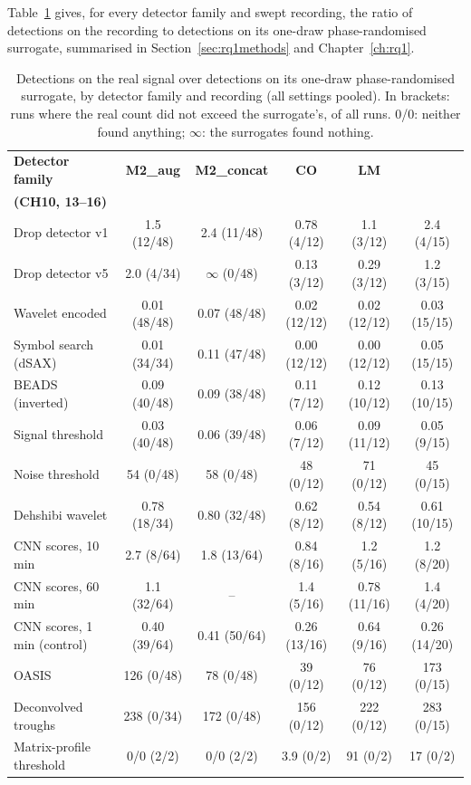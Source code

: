 Table~\ref{tab:detnull} gives, for every detector family and swept recording, the ratio of detections on the recording to detections on its one-draw phase-randomised surrogate, summarised in Section~\ref{sec:rq1methods} and Chapter~\ref{ch:rq1}.

\begin{table}[htbp]
\caption[{Real against surrogate detections, by detector family and recording.}]{Detections on the real signal over detections on its one-draw phase-randomised surrogate, by detector family and recording (all settings pooled). In brackets: runs where the real count did not exceed the surrogate's, of all runs. 0/0: neither found anything; $\infty$: the surrogates found nothing.}
\label{tab:detnull}
\footnotesize
\centering
\setlength{\tabcolsep}{3pt}
\begin{tabular}{lccccc}
\toprule
\textbf{Detector family} & \textbf{M2\_aug} & \textbf{M2\_concat} & \textbf{CO} & \textbf{LM} &
\makecell{\textbf{MJu26a}\\\textbf{(CH10, 13--16)}}\\
\midrule
Drop detector v1 & 1.5 (12/48) & 2.4 (11/48) & 0.78 (4/12) & 1.1 (3/12) & 2.4 (4/15)\\
Drop detector v5 & 2.0 (4/34) & $\infty$ (0/48) & 0.13 (3/12) & 0.29 (3/12) & 1.2 (3/15)\\
Wavelet encoded & 0.01 (48/48) & 0.07 (48/48) & 0.02 (12/12) & 0.02 (12/12) & 0.03 (15/15)\\
Symbol search (dSAX) & 0.01 (34/34) & 0.11 (47/48) & 0.00 (12/12) & 0.00 (12/12) & 0.05 (15/15)\\
BEADS (inverted) & 0.09 (40/48) & 0.09 (38/48) & 0.11 (7/12) & 0.12 (10/12) & 0.13 (10/15)\\
Signal threshold & 0.03 (40/48) & 0.06 (39/48) & 0.06 (7/12) & 0.09 (11/12) & 0.05 (9/15)\\
Noise threshold & 54 (0/48) & 58 (0/48) & 48 (0/12) & 71 (0/12) & 45 (0/15)\\
Dehshibi wavelet & 0.78 (18/34) & 0.80 (32/48) & 0.62 (8/12) & 0.54 (8/12) & 0.61 (10/15)\\
CNN scores, 10\,min & 2.7 (8/64) & 1.8 (13/64) & 0.84 (8/16) & 1.2 (5/16) & 1.2 (8/20)\\
CNN scores, 60\,min & 1.1 (32/64) & -- & 1.4 (5/16) & 0.78 (11/16) & 1.4 (4/20)\\
CNN scores, 1\,min (control) & 0.40 (39/64) & 0.41 (50/64) & 0.26 (13/16) & 0.64 (9/16) & 0.26 (14/20)\\
OASIS & 126 (0/48) & 78 (0/48) & 39 (0/12) & 76 (0/12) & 173 (0/15)\\
Deconvolved troughs & 238 (0/34) & 172 (0/48) & 156 (0/12) & 222 (0/12) & 283 (0/15)\\
Matrix-profile threshold & 0/0 (2/2) & 0/0 (2/2) & 3.9 (0/2) & 91 (0/2) & 17 (0/2)\\
\bottomrule
\end{tabular}
\end{table}
